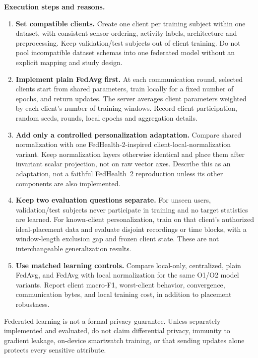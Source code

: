 \documentclass[10pt,a4paper]{article}
\begin{document}
\textbf{Execution steps and reasons.}
\begin{enumerate}
\item \textbf{Set compatible clients.} Create one client per training subject within one dataset, with consistent sensor ordering, activity labels, architecture and preprocessing. Keep validation/test subjects out of client training. Do not pool incompatible dataset schemas into one federated model without an explicit mapping and study design.
\item \textbf{Implement plain FedAvg first.} At each communication round, selected clients start from shared parameters, train locally for a fixed number of epochs, and return updates. The server averages client parameters weighted by each client's number of training windows. Record client participation, random seeds, rounds, local epochs and aggregation details.
\item \textbf{Add only a controlled personalization adaptation.} Compare shared normalization with one FedHealth-2-inspired client-local-normalization variant. Keep normalization layers otherwise identical and place them after invariant scalar projection, not on raw vector axes. Describe this as an adaptation, not a faithful FedHealth~2 reproduction unless its other components are also implemented.
\item \textbf{Keep two evaluation questions separate.} For unseen users, validation/test subjects never participate in training and no target statistics are learned. For known-client personalization, train on that client's authorized ideal-placement data and evaluate disjoint recordings or time blocks, with a window-length exclusion gap and frozen client state. These are not interchangeable generalization results.
\item \textbf{Use matched learning controls.} Compare local-only, centralized, plain FedAvg, and FedAvg with local normalization for the same O1/O2 model variants. Report client macro-F1, worst-client behavior, convergence, communication bytes, and local training cost, in addition to placement robustness.
\end{enumerate}
Federated learning is not a formal privacy guarantee. Unless separately implemented and evaluated, do not claim differential privacy, immunity to gradient leakage, on-device smartwatch training, or that sending updates alone protects every sensitive attribute.
\end{document}
